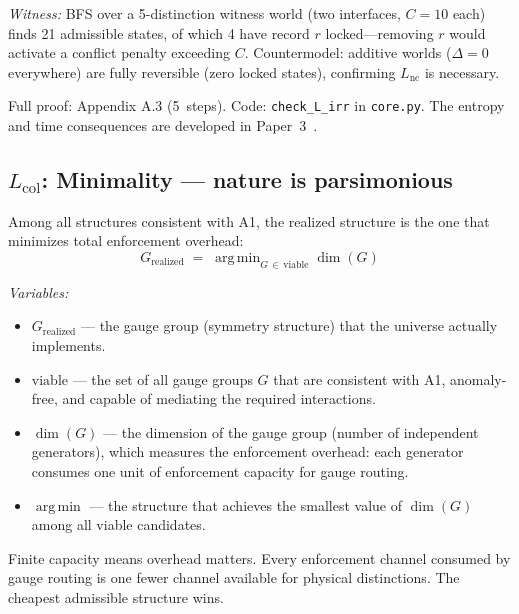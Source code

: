 \documentclass[11pt]{article}
\DeclareMathOperator*{\argmin}{arg\,min}
\begin{document}
\textit{Witness:} BFS over a 5-distinction witness world (two interfaces, $C=10$ each) finds 21 admissible states, of which 4 have record $r$ locked---removing $r$ would activate a conflict penalty exceeding $C$.  Countermodel: additive worlds ($\Delta = 0$ everywhere) are fully reversible (zero locked states), confirming $L_{\mathrm{nc}}$ is necessary.

Full proof: Appendix A.3 (5~steps).  Code: \texttt{check\_L\_irr} in \texttt{core.py}.  The entropy and time consequences are developed in Paper~3~\cite{P3}.


\subsection{\texorpdfstring{$L_{\mathrm{col}}$}{Lcol}: Minimality --- nature is parsimonious}

\begin{tcolorbox}[apfbox, title={Lemma $L_{\mathrm{col}}$ (Minimality / Capacity Optimization)}]
Among all structures consistent with A1, the realized structure is the one that minimizes total enforcement overhead:
\begin{equation}
G_{\mathrm{realized}} \;=\; \argmin_{G \,\in\, \mathrm{viable}} \dim(G)
\end{equation}

\smallskip\noindent\textit{Variables:}
\begin{itemize}[nosep,leftmargin=2em]
\item $G_{\mathrm{realized}}$ --- the gauge group (symmetry structure) that the universe actually implements.
\item $\mathrm{viable}$ --- the set of all gauge groups $G$ that are consistent with A1, anomaly-free, and capable of mediating the required interactions.
\item $\dim(G)$ --- the dimension of the gauge group (number of independent generators), which measures the enforcement overhead: each generator consumes one unit of enforcement capacity for gauge routing.
\item $\argmin$ --- the structure that achieves the smallest value of $\dim(G)$ among all viable candidates.
\end{itemize}

\smallskip\noindent
Finite capacity means overhead matters.  Every enforcement channel consumed by gauge routing is one fewer channel available for physical distinctions.  The cheapest admissible structure wins.
\end{tcolorbox}
\end{document}
